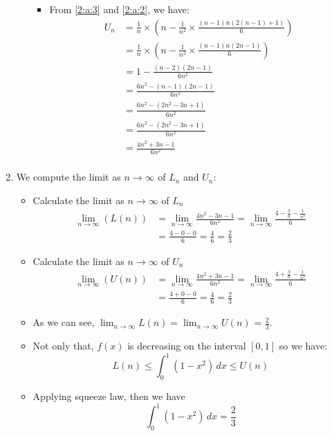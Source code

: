 \documentclass{article}
\begin{document}
\begin{enumerate}[label=({\alph*})]
\begin{itemize}
\begin{itemize}
                \item From \eqref{2:a:3} and \eqref{2:a:2}, we have:
                \begin{align*}
                    U_{n} &= \frac{1}{n} \times \left(n - \frac{1}{n^2} \times \frac{(n - 1)n(2(n - 1) + 1)}{6}\right) \\
                          &= \frac{1}{n} \times \left(n - \frac{1}{n^2} \times \frac{(n - 1)n(2n - 1)}{6}\right) \\
                          &= 1 - \frac{(n - 2)(2n - 1)}{6n^2} \\
                          &= \frac{6n^2 - (n - 1)(2n - 1)}{6n^2} \\
                          &= \frac{6n^2 - (2n^2 - 3n + 1)}{6n^2} \\
                          &= \frac{6n^2 - (2n^2 - 3n + 1)}{6n^2} \\
                          &= \frac{4n^2 + 3n - 1}{6n^2} \\
                \end{align*}
            \end{itemize}
        \end{itemize}
        \item We compute the limit as \(n \to \infty\) of \(L_{n}\) and \(U_{n}\):
        \begin{itemize}
            \item Calculate the limit as \(n \to \infty\) of \(L_{n}\)
            \begin{align}
                \lim_{n \to \infty}(L(n)) &=  \lim_{n \to \infty}\frac{4n^2 - 3n - 1}{6n^2} = \lim_{n \to \infty} \frac{4 - \frac{3}{n} - \frac{1}{n^2}}{6} \\
                                          &= \frac{4 - 0 - 0}{6} = \frac{4}{6} = \frac{2}{3}
            \end{align}
            \item Calculate the limit as \(n \to \infty\) of \(U_{n}\)
            \begin{align}
                \lim_{n \to \infty}(U(n)) &=  \lim_{n \to \infty}\frac{4n^2 + 3n - 1}{6n^2} = \lim_{n \to \infty} \frac{4 + \frac{3}{n} - \frac{1}{n^2}}{6} \\
                                          &= \frac{4 + 0 - 0}{6} = \frac{4}{6} = \frac{2}{3}
            \end{align}
            \item As we can see, \(\lim_{n \to \infty}L(n) = \lim_{n \to \infty}U(n)\) = \(\frac{2}{3}\).
            \item Not only that, \(f(x)\) is decreasing on the interval \([0, 1]\) so we have:
            \[L(n) \leq \int_0^1 (1 - x^2) \, dx \leq U(n)\]
            \item Applying squeeze law, then we have
            \[
                \int_0^1 (1 - x^2) \, dx = \frac{2}{3}
                \]
        \end{itemize}
    \end{enumerate}
    \newpage
\end{document}

